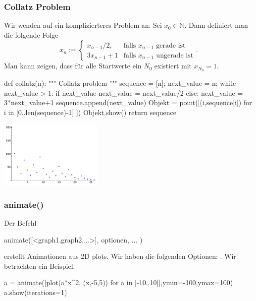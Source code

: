 \documentclass[fontsize=12pt,paper=a4,twoside,bibtotoc,idxtotoc,
liststotoc,pagesize,BCOR1.2cm,DIV15,chapterprefix,pagesize=pdftex]{scrbook}
\theoremstyle{plain}
\theoremstyle{definition}
\theoremstyle{remark}
\begin{document}
\subsubsection{Collatz Problem}
Wir wenden {\color{blue} } auf ein komplizierteres Problem an:
Sei $x_0\in \mathbb{N}$. Dann definiert man die folgende Folge
\[ x_n:= \left \{ \begin{array}{ll}
 x_{n-1}/2, & \mbox{falls } x_{n-1} \mbox{ gerade ist} \\
3x_{n-1}+1 & \mbox{falls } x_{n-1} \mbox{ ungerade ist} 
\end{array} \right. . \] 
Man kann zeigen, dass für alle Startwerte ein $N_0$ existiert mit $x_{N_0}=1$.
\begin{sagein}
def collatz(n):
    """ Collatz problem """
    sequence = [n]; next_value = n;
    while next_value > 1:
        if next_value %
            next_value = next_value/2
        else:
            next_value = 3*next_value+1
        sequence.append(next_value)
    Objekt = point([(i,sequence[i]) for i in [0..len(sequence)-1] ]) 
    Objekt.show()   
    return sequence
\end{sagein}
\begin{center}
\includegraphics[width=5cm]{collatz.pdf} 
\end{center}
\subsubsection{animate()}
Der Befehl 
\begin{sagein}
animate([<graph1,graph2,...>], optionen, ... ) 
\end{sagein}
erstellt Animationen aus 2D plots. Wir haben die folgenden Optionen: .
Wir betrachten ein Beispiel:
\begin{sagein}
a = animate([plot(a*x^2, (x,-5,5)) for a in [-10..10]],ymin=-100,ymax=100)
a.show(iterations=1)
\end{sagein}
\begin{center}
\end{center}
\end{document}
